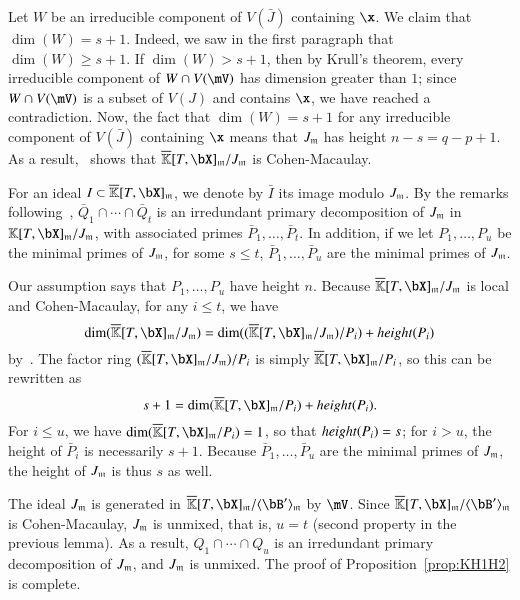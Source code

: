 \documentclass[amsthm]{elsart}
\begin{document}
Let $W$ be an irreducible component of $V(\bar J)$ containing $\x$.  We
claim that $\dim(W)=s+1$. Indeed, we saw in the first paragraph
that $\dim(W) \ge s+1$. If $\dim(W) > s+1$, then by Krull's theorem,
every irreducible component of $W \cap V(\mV)$ has dimension greater
than $1$; since $W \cap V(\mV)$ is a subset of $V(J)$ and contains $\x$,
we have reached a contradiction. Now, the fact that $\dim(W)=s+1$ for
any irreducible component of $V(\bar J)$ containing $\x$ means that
$\bar J_\m$ has height $n-s=q-p+1$.  As a
result,~\cite[Theorem~18.18]{Eisenbud95} shows that
$\KKbar[T,\bX]_\m/\bar J_\m$ is Cohen-Macaulay.

For an ideal $I \subset \KKbar[T,\bX]_\m$, we denote by $\bar I$ its
image modulo $\bar J_\m$.  By the remarks
following~\cite[Theorem~IV.5.9]{ZaSa58},
$\bar Q_1 \cap \cdots \cap \bar Q_t$ is an irredundant primary
decomposition of $\bar J_\m$ in
$\KK[T,\bX]_\m/\bar J_\m$, with associated primes
$\bar P_1,\dots,\bar P_t$. In addition, if we let $P_1,\dots,P_u$ be
the minimal primes of $J_\m$, for some $s \le t$,
$\bar P_1,\dots,\bar P_u$ are the minimal primes of $\bar J_\m$.

Our assumption says that $P_1,\dots,P_u$ have height $n$. Because
$\KKbar[T,\bX]_\m/\bar J_\m$ is local and Cohen-Macaulay, for any
$i \le t$, we have 
$$\dim(\KKbar[T,\bX]_\m/\bar J_\m)=\dim((\KKbar[T,\bX]_\m/\bar J_\m) / \bar P_i) + {\rm height}(\bar P_i)$$
by~\cite[Theorem~17.4(i)]{Matsumura86}.
The factor ring $(\KKbar[T,\bX]_\m/\bar J_\m) / \bar P_i$ is simply
$\KKbar[T,\bX]_\m/P_i$, so this can be rewritten as
$$s+1 = \dim(\KKbar[T,\bX]_\m/P_i) + {\rm height}(\bar P_i).$$ For $i\le
u$, we have $\dim(\KKbar[T,\bX]_\m/P_i)=1$, so that ${\rm height}(\bar
P_i)=s$; for $i > u$, the height of $\bar P_i$ is necessarily
$s+1$. Because $\bar P_1,\dots,\bar P_u$ are the minimal primes of
$\bar J_\m$, the height of $\bar J_\m$ is thus $s$ as well.

The ideal $\bar J_\m$ is generated in $\KKbar[T,\bX]_\m/\langle \bB'
\rangle_\m$ by $\mV$. Since $\KKbar[T,\bX]_\m/\langle
\bB' \rangle_\m$ is Cohen-Macaulay, $\bar J_\m$ is unmixed, that is,
$u=t$ (second property in the previous lemma).  As a result, $Q_1 \cap
\cdots \cap Q_u$ is an irredundant primary decomposition of $J_\m$,
and $J_\m$ is unmixed. The proof of Proposition~\ref{prop:KH1H2} is complete.

\end{document}
